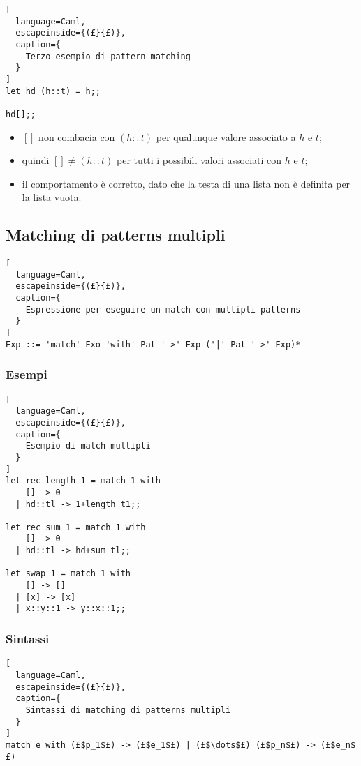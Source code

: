 \begin{lstlisting}[
  language=Caml,
  escapeinside={(£}{£)},
  caption={
    Terzo esempio di pattern matching
  }
]
let hd (h::t) = h;;

hd[];;
\end{lstlisting}
\begin{itemize}
  \item $[]$ non combacia con $(h::t)$ per qualunque valore associato a $h$ e
    $t$;
  \item quindi $[]\neq(h::t)$ per tutti i possibili valori associati con $h$ e
    $t$;
  \item il comportamento è corretto, dato che la testa di una lista non è
    definita per la lista vuota.
\end{itemize}

\subsection{Matching di patterns multipli}
\begin{lstlisting}[
  language=Caml,
  escapeinside={(£}{£)},
  caption={
    Espressione per eseguire un match con multipli patterns
  }
]
Exp ::= 'match' Exo 'with' Pat '->' Exp ('|' Pat '->' Exp)*
\end{lstlisting}

\subsubsection{Esempi}
\begin{lstlisting}[
  language=Caml,
  escapeinside={(£}{£)},
  caption={
    Esempio di match multipli
  }
]
let rec length 1 = match 1 with
    [] -> 0
  | hd::tl -> 1+length t1;;

let rec sum 1 = match 1 with
    [] -> 0
  | hd::tl -> hd+sum tl;;

let swap 1 = match 1 with
    [] -> []
  | [x] -> [x]
  | x::y::1 -> y::x::1;;
\end{lstlisting}

\subsubsection{Sintassi}
\begin{lstlisting}[
  language=Caml,
  escapeinside={(£}{£)},
  caption={
    Sintassi di matching di patterns multipli
  }
]
match e with (£$p_1$£) -> (£$e_1$£) | (£$\dots$£) (£$p_n$£) -> (£$e_n$£)
\end{lstlisting}

